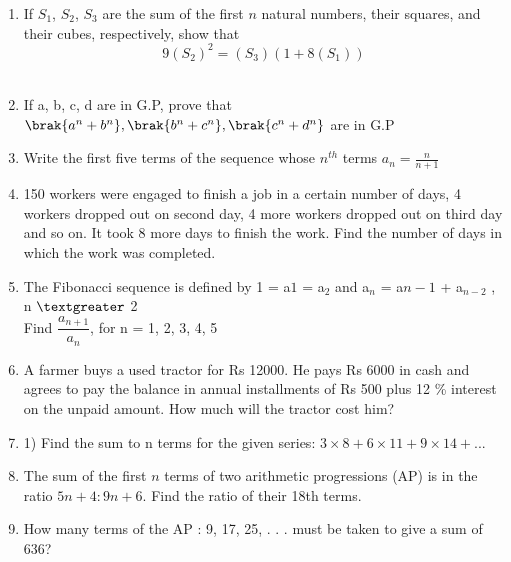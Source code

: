 \begin{enumerate}[label=\thesection.\arabic*,ref=\thesection.\theenumi]
\item If \(S_1\), \(S_2\), \(S_3\) are the sum of the first \(n\) natural numbers, their squares, and their cubes, respectively, show that 
\[ 9(S_2)^2 = (S_3)(1 + 8(S_1)) \]\\
\solution
\pagebreak


\item If a, b, c, d are in G.P, prove that 
$ \brak{a^{n} + b^{n}},\brak{b^{n} + c^{n}},\brak{c^{n} + d^{n}} $ are in G.P \\
\solution

\pagebreak

\item Write the first five terms of the sequence whose $n^{th}$ terms  $a_n = \frac{n}{n+1}$\\
\solution

\pagebreak

\item 150 workers were engaged to finish a job in a certain number of days, 4 workers dropped out on second day, 4 more workers dropped out on third day and so on. It took 8 more days to finish the work. Find the number of days in which the work was completed.\\
\solution
\pagebreak

\item The Fibonacci sequence is defined by 1 = a$1$ = a$_2$ and a$_n$ = a${n-1}$ + a$_{n-2}$ , n $\textgreater$ 2\\
Find $\dfrac{a_{n + 1}}{a_n}$, for n = 1, 2, 3, 4, 5\\
\solution
\pagebreak

\item  A farmer buys a used tractor for Rs 12000. He pays Rs 6000 in cash and agrees to pay the balance in annual installments of Rs 500 plus 12 \% interest on the unpaid amount. How much will the tractor cost him?
\solution
\pagebreak

\item 1) Find the sum to n terms for the given series: $3\times8 + 6\times11 + 9\times14 + ...$
\solution
\pagebreak

\item The sum of the first $n$ terms of two arithmetic progressions (AP) is in the ratio $5n+4 : 9n+6$. Find the ratio of their 18th terms.\\
\solution
\pagebreak

\item How many terms of the AP : 9, 17, 25, . . . must be taken to give a sum of 636?
\solution
\pagebreak

\end{enumerate}
